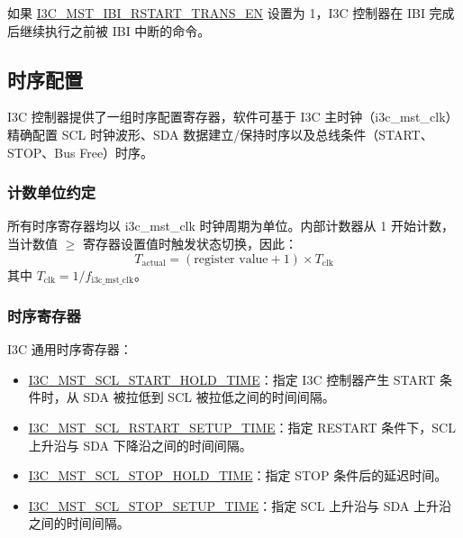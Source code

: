 \documentclass[main\_\_CN.tex]{subfiles}
\begin{document}
如果 \hyperref[fielddesc:I3CMSTREGIBIRSTARTTRANSEN]{I3C\_MST\_IBI\_RSTART\_TRANS\_EN} 设置为 1，I3C 控制器在 IBI 完成后继续执行之前被 IBI 中断的命令。

\subsection{时序配置}
I3C 控制器提供了一组时序配置寄存器，软件可基于 I3C 主时钟（i3c\_mst\_clk）精确配置 SCL 时钟波形、SDA 数据建立/保持时序以及总线条件（START、STOP、Bus Free）时序。

\subsubsection{计数单位约定}
所有时序寄存器均以 i3c\_mst\_clk 时钟周期为单位。内部计数器从 1 开始计数，当计数值 $\geq$ 寄存器设置值时触发状态切换，因此：
\begin{equation}
    T_\text{actual} = (\text{register value} + 1) \times T_\text{clk}
    \label{eq:timing_unit}
\end{equation}
其中 $T_\text{clk} = 1/f_\mathrm{i3c\_mst\_clk}$。

\subsubsection{时序寄存器}
I3C 通用时序寄存器：
\begin{itemize}
    \item \hyperref[fielddesc:I3CMSTREGSCLSTARTHOLDTIME]{I3C\_MST\_SCL\_START\_HOLD\_TIME}：指定 I3C 控制器产生 START 条件时，从 SDA 被拉低到 SCL 被拉低之间的时间间隔。
    \item \hyperref[fielddesc:I3CMSTREGSCLRSTARTSETUPTIME]{I3C\_MST\_SCL\_RSTART\_SETUP\_TIME}：指定 RESTART 条件下，SCL 上升沿与 SDA 下降沿之间的时间间隔。
    \item \hyperref[fielddesc:I3CMSTREGSCLSTOPHOLDTIME]{I3C\_MST\_SCL\_STOP\_HOLD\_TIME}：指定 STOP 条件后的延迟时间。
    \item \hyperref[fielddesc:I3CMSTREGSCLSTOPSETUPTIME]{I3C\_MST\_SCL\_STOP\_SETUP\_TIME}：指定 SCL 上升沿与 SDA 上升沿之间的时间间隔。
\end{itemize}
\end{document}
